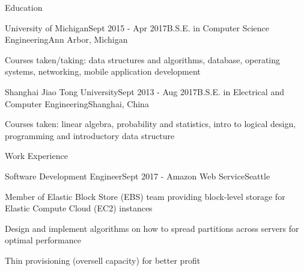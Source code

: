 \documentclass{resume} %
\begin{document}

\begin{rSection}{Education}
\begin{rSubsection}{University of Michigan}{Sept 2015 - Apr 2017}{B.S.E. in Computer Science Engineering}{Ann Arbor, Michigan}
	\item Courses taken/taking: data structures and algorithms, database, operating systems, networking, mobile application development
\end{rSubsection}

\begin{rSubsection}{Shanghai Jiao Tong University}{Sept 2013 - Aug 2017}{B.S.E. in Electrical and Computer Engineering}{Shanghai, China}
	\item Courses taken: linear algebra, probability and statistics, intro to logical design, programming and introductory data structure
\end{rSubsection}



\end{rSection}

\begin{rSection}{Work Experience}
	\begin{rSubsection}{Software Development Engineer}{Sept 2017 - }{Amazon Web Service}{Seattle}
		\item Member of Elastic Block Store (EBS) team providing block-level storage for Elastic Compute Cloud (EC2) instances
		\item Design and implement algorithms on how to spread partitions across servers for optimal performance
		\item Thin provisioning (oversell capacity) for better profit
	\end{rSubsection}
\end{rSection}
\end{document}
